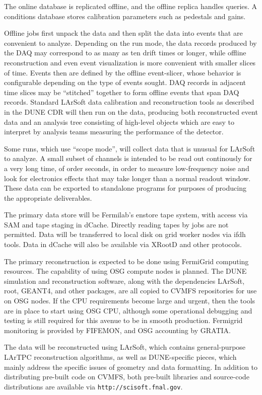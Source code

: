 The online database is replicated offline, and the offline replica handles queries.  A conditions database
stores calibration parameters such as pedestals and gains.

Offline jobs first unpack the data and then split the data into events that are convenient to analyze.
Depending on the run mode, the data records produced by the DAQ may correspond to as many as ten
drift times or longer, while offline reconstruction and even event visualization is more convenient with
smaller slices of time.  Events then are defined by the offline event-slicer, whose behavior is configurable
depending on the type of events sought.  DAQ records in adjacent time slices may be ``stitched'' together
to form offline events that span DAQ records.  Standard LArSoft data calibration and reconstruction tools
as described in the DUNE CDR will then run on the data, producing both reconstructed event data and an
analysis tree consisting of high-level objects which are easy to interpret by analysis teams measuring
the performance of the detector.

Some runs, which use ``scope mode'', will collect data that is unusual for LArSoft to analyze.  A small subset
of channels is intended to be read out continously for a very long time, of order seconds, in order to measure
low-frequency noise and look for electronics effects that may take longer than a normal readout window.
These data can be exported to standalone programs for purposes of producing the appropriate deliverables.

The primary data store will be Fermilab's enstore tape system, with access via SAM and tape staging in
dCache.  Directly reading tapes by jobs are not permitted.  Data will be transferred to local disk on grid
worker nodes via ifdh tools.  Data in dCache will also be available via XRootD and other protocols.

The primary reconstruction is expected to be done using FermiGrid computing resources.  The capability
of using OSG compute nodes is planned.  The DUNE simulation and reconstruction software, along with the
dependencies LArSoft, root, GEANT4, and other packages, are all copied to CVMFS repositories for use on
OSG nodes.  If the CPU requirements become large and urgent, then the tools are in place to start using
OSG CPU, although some operational debugging and testing is still required for this avenue to be in smooth
production.  Fermigrid monitoring is provided by FIFEMON, and OSG accounting by GRATIA.

The data will be reconstructed using LArSoft, which contains general-purpose LArTPC reconstruction algorithms,
as well as DUNE-specific pieces, which mainly address the specific issues of geometry and data formatting.
In addition to distributing pre-built code on CVMFS, both pre-built libraries and source-code distributions
are available via {\tt http://scisoft.fnal.gov}.


